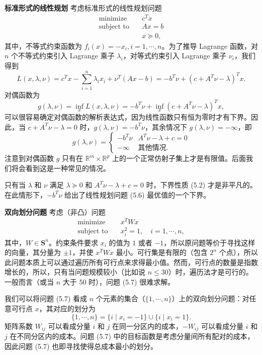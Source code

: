 \documentclass[UTF8, 12pt, fontset=fandol, oneside]{ctexart}
\begin{document}
\noindent\textbf{标准形式的线性规划}\quad
考虑标准形式的线性规划问题
\begin{equation}
\begin{aligned}
\text{minimize}\quad & c^T x\\
\text{subject to}\quad & Ax=b\\
& x\succeq 0,
\end{aligned}
\tag{5.6}
\end{equation}
其中，不等式约束函数为 $f_i(x)=-x_i,i=1,\cdots,n$。为了推导 Lagrange 函数，对 $n$ 个不等式约束引入 Lagrange 乘子 $\lambda_i$，对等式约束引入 Lagrange 乘子 $\nu_i$，我们得到
\[
L(x,\lambda,\nu)=c^Tx-\sum_{i=1}^n \lambda_i x_i+\nu^T(Ax-b)
=-b^T\nu+(c+A^T\nu-\lambda)^T x.
\]
对偶函数为
\[
g(\lambda,\nu)=\inf_x L(x,\lambda,\nu)=-b^T\nu+\inf_x(c+A^T\nu-\lambda)^Tx,
\]
可以很容易确定对偶函数的解析表达式，因为线性函数只有恒为零时才有下界。因此，当 $c+A^T\nu-\lambda=0$ 时，$g(\lambda,\nu)=-b^T\nu$，其余情况下 $g(\lambda,\nu)=-\infty$，即
\[
g(\lambda,\nu)=
\begin{cases}
-b^T\nu & A^T\nu-\lambda+c=0\\
-\infty & \text{其他情况}.
\end{cases}
\]
注意到对偶函数 $g$ 只有在 $\mathbb{R}^m\times\mathbb{R}^p$ 上的一个正常仿射子集上才是有限值。后面我们将会看到这是一种常见的情况。

只有当 $\lambda$ 和 $\nu$ 满足 $\lambda\succeq 0$ 和 $A^T\nu-\lambda+c=0$ 时，下界性质 (5.2) 才是非平凡的。在此情形下，$-b^T\nu$ 给出了线性规划问题 (5.6) 最优值的一个下界。

\noindent\textbf{双向划分问题}\quad
考虑（非凸）问题
\begin{equation}
\begin{aligned}
\text{minimize}\quad & x^T W x\\
\text{subject to}\quad & x_i^2=1,\quad i=1,\cdots,n,
\end{aligned}
\tag{5.7}
\end{equation}
其中，$W\in\mathbf{S}^n$。约束条件要求 $x_i$ 的值为 $1$ 或者 $-1$，所以原问题等价于寻找这样的向量，其分量为 $\pm 1$，并使 $x^TWx$ 最小。可行集是有限的（包含 $2^n$ 个点），所以此问题本质上可以通过遍历所有可行点来求得最小值。然而，可行点的数量是指数增长的，所以，只有当问题规模较小（比如说 $n\leq 30$）时，遍历法才是可行的。一般而言（或当 $n$ 大于 50 时），问题 (5.7) 很难求解。

我们可以将问题 (5.7) 看成 $n$ 个元素的集合（$\{1,\cdots,n\}$）上的双向划分问题：对任意可行点 $x$，其对应的划分为
\[
\{1,\cdots,n\}=\{i\mid x_i=-1\}\cup\{i\mid x_i=1\}.
\]
矩阵系数 $W_{ij}$ 可以看成分量 $i$ 和 $j$ 在同一分区内的成本，$-W_{ij}$ 可以看成分量 $i$ 和 $j$ 在不同分区内的成本。问题 (5.7) 中的目标函数是考虑分量间所有配对的成本，因此问题 (5.7) 也即寻找使得总成本最小的划分。
\end{document}

